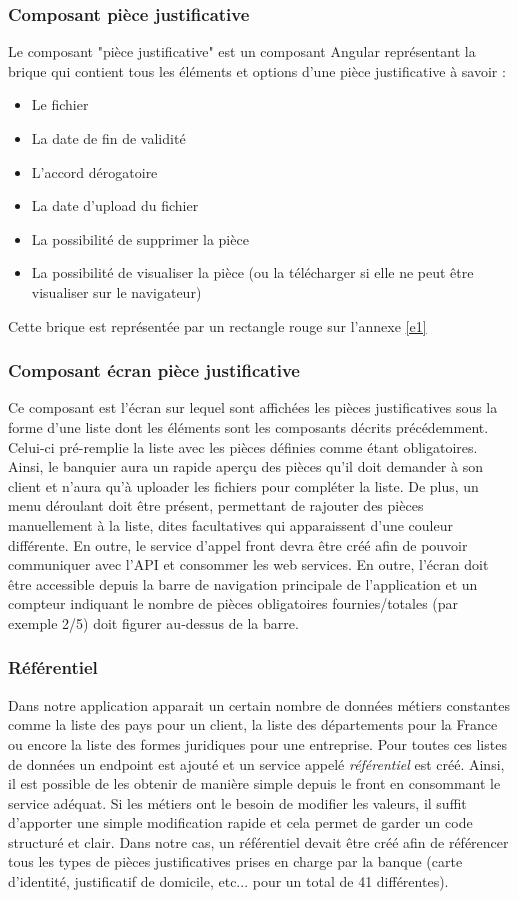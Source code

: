 	\subsubsection{Composant pièce justificative}
	Le composant "pièce justificative" est un composant Angular représentant la brique qui contient tous les éléments et options d'une pièce justificative à savoir :
	\begin{itemize}
		\item Le fichier
		\item La date de fin de validité
		\item L'accord dérogatoire
		\item La date d'upload du fichier
		\item La possibilité de supprimer la pièce
		\item La possibilité de visualiser la pièce (ou la télécharger si elle ne peut être visualiser sur le navigateur)
	\end{itemize}
	Cette brique est représentée par un rectangle rouge sur l'annexe \ref{e1}
	
	\subsubsection{Composant écran pièce justificative}
	Ce composant est l'écran sur lequel sont affichées les pièces justificatives sous la forme d'une liste dont les éléments sont les composants décrits précédemment. Celui-ci pré-remplie la liste avec les pièces définies comme étant obligatoires. Ainsi, le banquier aura un rapide aperçu des pièces qu'il doit demander à son client et n'aura qu'à uploader les fichiers pour compléter la liste. De plus, un menu déroulant doit être présent, permettant de rajouter des pièces manuellement à la liste, dites facultatives qui apparaissent d'une couleur différente. En outre, le service d'appel front devra être créé afin de pouvoir communiquer avec l'API et consommer les web services. En outre, l'écran doit être accessible depuis la barre de navigation principale de l'application et un compteur indiquant le nombre de pièces obligatoires fournies/totales (par exemple 2/5) doit figurer au-dessus de la barre.
	
	\subsubsection{Référentiel}
	Dans notre application apparait un certain nombre de données métiers constantes comme la liste des pays pour un client, la liste des départements pour la France ou encore la liste des formes juridiques pour une entreprise. Pour toutes ces listes de données un endpoint est ajouté et un service appelé \textit{référentiel} est créé. Ainsi, il est possible de les obtenir de manière simple depuis le front en consommant le service adéquat. Si les métiers ont le besoin de modifier les valeurs, il suffit d'apporter une simple modification rapide et cela permet de garder un code structuré et clair. Dans notre cas, un référentiel devait être créé afin de référencer tous les types de pièces justificatives prises en charge par la banque (carte d'identité, justificatif de domicile, etc... pour un total de 41 différentes).	
	
